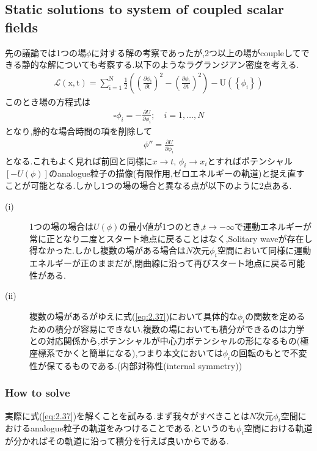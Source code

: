 \documentclass[dvipdfmx,11pt,a4paper]{jsbook}
\begin{document}
\subsection{Static solutions to system of coupled scalar fields}
先の議論では1つの場$\phi$に対する解の考察であったが,2つ以上の場がcoupleしてできる静的な解についても考察する.以下のようなラグランジアン密度を考える.
\begin{align}
    \mathscr{L}(\mathrm{x}, \mathrm{t})=\sum_{\mathrm{i}=1}^{\mathrm{N}} \frac{1}{2}\left(\left(\frac{\partial \phi_{\mathrm{i}}}{\partial \mathrm{t}}\right)^{2}-\left(\frac{\partial \phi_{\mathrm{i}}}{\partial \mathrm{t}}\right)^{2}\right)-\mathrm{U}\left(\left\{\phi_{\mathrm{i}}\right\}\right)
\end{align}
このとき場の方程式は
\begin{align}
    \square \phi_{i}=-\frac{\partial U}{\partial \phi_{i}} ; \quad i=1, \ldots, N
\end{align}
となり,静的な場合時間の項を削除して
\begin{align}
    \phi''=\frac{\partial U}{\partial\phi_i}\label{eq:2.37}
\end{align}
となる.これもよく見れば前回と同様に$x\rightarrow t$, $\phi_i\rightarrow x_i$とすればポテンシャル$[-U(\phi)]$のanalogue粒子の描像(有限作用,ゼロエネルギーの軌道)と捉え直すことが可能となる.しかし1つの場の場合と異なる点が以下のように2点ある.
\begin{description}
    \item[(i)] 1つの場の場合は$U(\phi)$の最小値が1つのとき,$t\rightarrow -\infty$で運動エネルギーが常に正となり二度とスタート地点に戻ることはなく,Solitary waveが存在し得なかった.しかし複数の場がある場合は$N$次元$\phi_i$空間において同様に運動エネルギーが正のままだが,閉曲線に沿って再びスタート地点に戻る可能性がある.
    \item[(ii)] 複数の場があるがゆえに式(\ref{eq:2.37})において具体的な$\phi_i$の関数を定めるための積分が容易にできない.複数の場においても積分ができるのは力学との対応関係から,ポテンシャルが中心力ポテンシャルの形になるもの(極座標系でかくと簡単になる),つまり本文においては$\phi_i$の回転のもとで不変性が保てるものである.(内部対称性(internal symmetry))
\end{description}

\subsubsection{How to solve}
実際に式(\ref{eq:2.37})を解くことを試みる.まず我々がすべきことは$N$次元$\phi_i$空間におけるanalogue粒子の軌道をみつけることである.というのも$\phi_i$空間における軌道が分かればその軌道に沿って積分を行えば良いからである.
\end{document}
